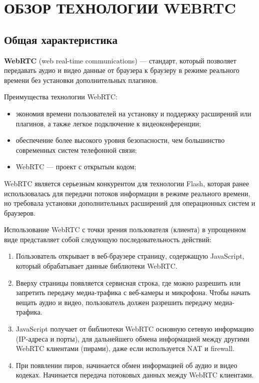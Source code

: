 \section[Обзор технологии WebRTC]{%
  ОБЗОР ТЕХНОЛОГИИ WEBRTC
}
\label{sec:webrtc}

\subsection{Общая характеристика}
\label{ssec:webrtc_overview}

\textbf{WebRTC} (web real-time communications) --- стандарт, 
который позволяет передавать аудио и видео данные от браузера к браузеру
в режиме реального времени без установки дополнительных плагинов.

Преимущества технологии WebRTC:
\begin{itemize}
\item экономия времени пользователей на установку и поддержку расширений или плагинов,
  а также легкое подключение к видеоконференции;
\item обеспечение более высокого уровня безопасности, чем большинство современных систем
  телефонной связи;
\item WebRTC --- проект с открытым кодом;
\end{itemize}

WebRTC является серьезным конкурентом для технологии Flash,
которая ранее использовалась для передачи потоков информации в режиме реального времени,
но требовала установки дополнительных расширений для операционных систем и браузеров.

Использование WebRTC с точки зрения пользователя (клиента) в упрощенном виде 
представляет собой следующую последовательность действий:
\begin{enumerate}
\item Пользователь открывает в веб-браузере страницу, содержащую JavaScript,
  который обрабатывает данные библиотеки WebRTC.
\item Вверху страницы появляется сервисная строка, где можно разрешить или
  запретить передачу медиа-трафика с веб-камеры и микрофона. 
  Чтобы начать вещать аудио и видео, пользователь должен разрешить передачу медиа-трафика.
\item JavaScript получает от библиотеки WebRTC основную сетевую информацию 
  (IP-адреса и порты), для дальнейшего обмена информацией между другими WebRTC клиентами
  (пирами), даже если используется NAT и firewall.
\item При появлении пиров, начинается обмен информацией об аудио и видео кодеках.
  Начинается передача потоковых данных между WebRTC клиентами.
\end{enumerate}

